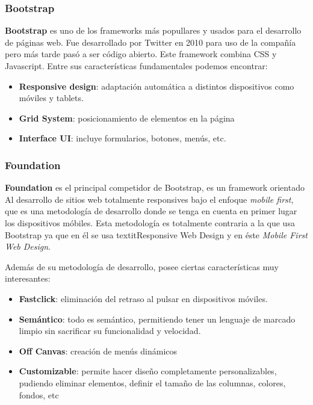         
    \subsubsection{Bootstrap}
    \textbf{Bootstrap} es uno de los frameworks más popullares y usados para el desarrollo
    de páginas web. Fue desarrollado por Twitter en 2010 para uso de la compañía pero
    más tarde pasó a ser código abierto. Este framework combina CSS y Javascript. Entre
    sus características fundamentales podemos encontrar:
    
        
        \begin{itemize}
            \item \textbf{Responsive design}: adaptación automática a distintos dispositivos
            como móviles y tablets.
            \item \textbf{Grid System}: posicionamiento de elementos en la página
            \item \textbf{Interface UI}: incluye formularios, botones, menús, etc.
        \end{itemize}
        
        \subsubsection{Foundation}
        \textbf{Foundation} es el principal competidor de Bootstrap, es un framework orientado Al
        desarrollo de sitios web totalmente responsives bajo el enfoque  \textit{mobile 
        first}, que es una metodología de desarrollo donde se tenga en cuenta en primer lugar
        los dispositivos móbiles. Esta metodología es totalmente contraria a la que usa
        Bootstrap ya que en él se usa   textit{Responsive Web Design} y en éste \textit{Mobile
        First Web Design}.
        
        Además de su metodología de desarrollo, posee ciertas características muy interesantes:
        
        \begin{itemize}
            \item \textbf{Fastclick}: eliminación del retraso al pulsar en dispositivos
            móviles.
            \item \textbf{Semántico}: todo es semántico, permitiendo tener un lenguaje de
            marcado limpio sin sacrificar su funcionalidad y velocidad.
            \item \textbf{Off Canvas}: creación de menús dinámicos
            \item \textbf{Customizable}: permite hacer diseño completamente personalizables,
            pudiendo eliminar elementos, definir el tamaño de las columnas, colores,
            fondos, etc
        \end{itemize}

